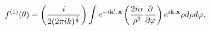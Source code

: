 \begin{equation}
f^{\left( 1\right) }(\theta )=\left( \frac{i}{2(2\pi ik)^{\frac{1}{2}}}%
\right) \int e^{-i\mathbf{k}^{\prime }.\mathbf{x}}\left( \frac{2i\alpha }{%
\rho ^{2}}\frac{\partial }{\partial \varphi }\right) e^{i\mathbf{k}.\mathbf{x%
}}\rho d\rho d\varphi,
\label{eq4}
\end{equation}

